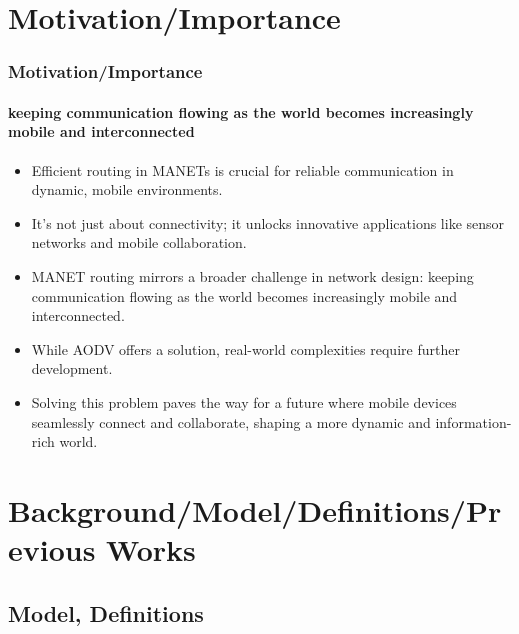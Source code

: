 \documentclass[11pt]{beamer}              %
\begin{document}
\section{Motivation/Importance}
\begin{frame}
\frametitle{Motivation/Importance}
\framesubtitle{keeping communication flowing as the world becomes increasingly mobile and interconnected}

\begin{itemize}
    \item Efficient routing in MANETs is crucial for reliable communication in dynamic, mobile environments. 
    
    \item It's not just about connectivity; it unlocks innovative applications like sensor networks and mobile collaboration. 
    
    \item MANET routing mirrors a broader challenge in network design: keeping communication flowing as the world becomes increasingly mobile and interconnected. 
    
    \item While AODV offers a solution, real-world complexities require further development. 
    
    \item Solving this problem paves the way for a future where mobile devices seamlessly connect and collaborate, shaping a more dynamic and information-rich world.
\end{itemize}
\end{frame}

\section{Background/Model/Definitions/Previous Works}


\subsection{Model, Definitions}
\end{document}
